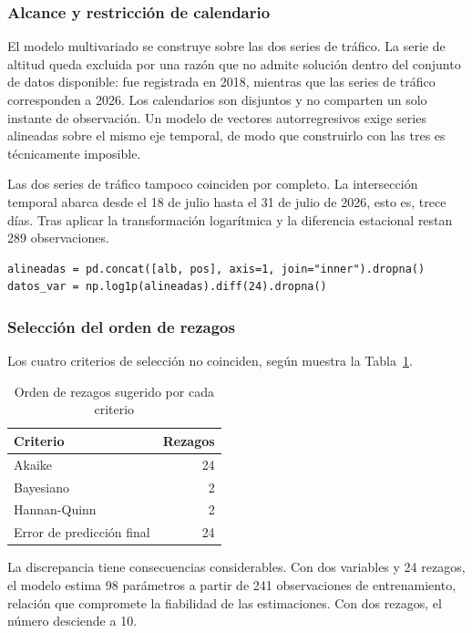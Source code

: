 \subsubsection{Alcance y restricción de calendario}

El modelo multivariado se construye sobre las dos series de tráfico. La serie de altitud queda
excluida por una razón que no admite solución dentro del conjunto de datos disponible: fue
registrada en 2018, mientras que las series de tráfico corresponden a 2026. Los calendarios son
disjuntos y no comparten un solo instante de observación. Un modelo de vectores autorregresivos
exige series alineadas sobre el mismo eje temporal, de modo que construirlo con las tres es técnicamente imposible.

Las dos series de tráfico tampoco coinciden por completo. La intersección temporal abarca desde
el 18 de julio hasta el 31 de julio de 2026, esto es, trece días. Tras aplicar la
transformación logarítmica y la diferencia estacional restan 289 observaciones.

\begin{lstlisting}[caption={Alineación temporal y transformación previa al modelo multivariado}]
alineadas = pd.concat([alb, pos], axis=1, join="inner").dropna()
datos_var = np.log1p(alineadas).diff(24).dropna()
\end{lstlisting}

\subsubsection{Selección del orden de rezagos}

Los cuatro criterios de selección no coinciden, según muestra la Tabla~\ref{tab:var_orden}.

\begin{table}[htbp]
\centering
\caption{Orden de rezagos sugerido por cada criterio}
\label{tab:var_orden}
\small
\begin{tabular}{lr}
\toprule
\textbf{Criterio} & \textbf{Rezagos} \\
\midrule
Akaike & 24 \\
Bayesiano & 2 \\
Hannan-Quinn & 2 \\
Error de predicción final & 24 \\
\bottomrule
\end{tabular}
\end{table}

La discrepancia tiene consecuencias considerables. Con dos variables y 24 rezagos, el modelo
estima 98 parámetros a partir de 241 observaciones de entrenamiento, relación que compromete la
fiabilidad de las estimaciones. Con dos rezagos, el número desciende a 10.

